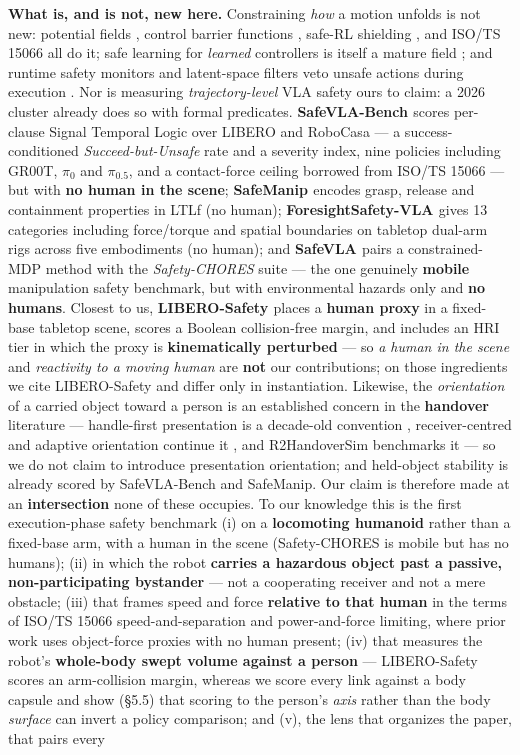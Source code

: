 \documentclass{article}
\begin{document}
\textbf{What is, and is not, new here.} Constraining \emph{how} a motion unfolds is not new: potential fields \citep{ref8}, control barrier functions \citep{ref9}, safe-RL shielding \citep{ref10}, and ISO/TS 15066 \citep{ref11} all do it; safe learning for \emph{learned} controllers is itself a mature field \citep{ref16}; and runtime safety monitors and latent-space filters veto unsafe actions during execution \citep{ref17,ref18}. Nor is measuring \emph{trajectory-level} VLA safety ours to claim: a 2026 cluster already does so with formal predicates. \textbf{SafeVLA-Bench \citep{ref27}} scores per-clause Signal Temporal Logic over LIBERO and RoboCasa --- a success-conditioned \emph{Succeed-but-Unsafe} rate and a severity index, nine policies including GR00T, $\pi_0$ and $\pi_{0.5}$, and a contact-force ceiling borrowed from ISO/TS 15066 --- but with \textbf{no human in the scene}; \textbf{SafeManip \citep{ref30}} encodes grasp, release and containment properties in LTLf (no human); \textbf{ForesightSafety-VLA \citep{ref23}} gives 13 categories including force/torque and spatial boundaries on tabletop dual-arm rigs across five embodiments (no human); and \textbf{SafeVLA \citep{ref21}} pairs a constrained-MDP method with the \emph{Safety-CHORES} suite --- the one genuinely \textbf{mobile} manipulation safety benchmark, but with environmental hazards only and \textbf{no humans}. Closest to us, \textbf{LIBERO-Safety \citep{ref24}} places a \textbf{human proxy} in a fixed-base tabletop scene, scores a Boolean collision-free margin, and includes an HRI tier in which the proxy is \textbf{kinematically perturbed} --- so \emph{a human in the scene} and \emph{reactivity to a moving human} are \textbf{not} our contributions; on those ingredients we cite LIBERO-Safety and differ only in instantiation. Likewise, the \emph{orientation} of a carried object toward a person is an established concern in the \textbf{handover} literature --- handle-first presentation is a decade-old convention \citep{ref53,ref55}, receiver-centred and adaptive orientation continue it \citep{ref32,ref33}, and R2HandoverSim benchmarks it \citep{ref34} --- so we do not claim to introduce presentation orientation; and held-object stability is already scored by SafeVLA-Bench and SafeManip. Our claim is therefore made at an \textbf{intersection} none of these occupies. To our knowledge this is the first execution-phase safety benchmark (i) on a \textbf{locomoting humanoid} rather than a fixed-base arm, with a human in the scene (Safety-CHORES \citep{ref21} is mobile but has no humans); (ii) in which the robot \textbf{carries a hazardous object past a passive, non-participating bystander} --- not a cooperating receiver and not a mere obstacle; (iii) that frames speed and force \textbf{relative to that human} in the terms of ISO/TS 15066 speed-and-separation and power-and-force limiting, where prior work uses object-force proxies with no human present; (iv) that measures the robot's \textbf{whole-body swept volume against a person} --- LIBERO-Safety scores an arm-collision margin, whereas we score every link against a body capsule and show (\S5.5) that scoring to the person's \emph{axis} rather than the body \emph{surface} can invert a policy comparison; and (v), the lens that organizes the paper, that pairs every 
\end{document}

